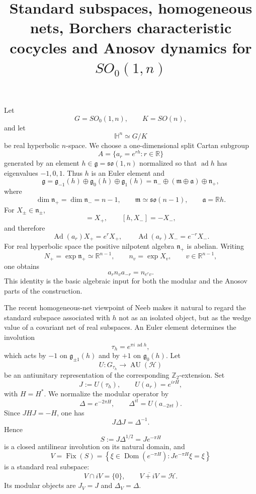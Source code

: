 \documentclass[11pt]{article}
\title{\boldmath Standard subspaces, homogeneous nets, Borchers characteristic cocycles and Anosov dynamics for \(SO_0(1,n)\)}
\author[a]{}
\affiliation[a]{}
\theoremstyle{definition}
\newcommand{\cH}{\mathcal{H}}
\newcommand{\Ad}{\operatorname{Ad}}
\newcommand{\Dom}{\operatorname{Dom}}
\begin{document}
\maketitle

Let
\[
G=SO_0(1,n),\qquad K=SO(n),
\]
and let
\[
\mathbb H^n\simeq G/K
\]
be real hyperbolic \(n\)-space.  We choose a one-dimensional split Cartan subgroup
\[
A=\{a_r=e^{rh}:r\in\mathbb R\}
\]
generated by an element \(h\in\mathfrak g=\mathfrak{so}(1,n)\) normalized so that
\(\operatorname{ad}h\) has eigenvalues \(-1,0,1\).  Thus \(h\) is an Euler element and
\[
\mathfrak g
=
\mathfrak g_{-1}(h)\oplus \mathfrak g_0(h)\oplus \mathfrak g_1(h)
=
\mathfrak n_-\oplus(\mathfrak m\oplus\mathfrak a)\oplus\mathfrak n_+,
\]
where
\[
\dim \mathfrak n_+=\dim\mathfrak n_-=n-1,\qquad
\mathfrak m\simeq\mathfrak{so}(n-1),\qquad
\mathfrak a=\mathbb Rh.
\]
For \(X_\pm\in\mathfrak n_\pm\),
\begin{equation}
[h,X_+]=X_+,\qquad [h,X_-]=-X_-,
\end{equation}
and therefore
\begin{equation}
\Ad(a_r)X_+=e^rX_+,\qquad
\Ad(a_r)X_-=e^{-r}X_-.
\label{eq:root-scaling}
\end{equation}
For real hyperbolic space the positive nilpotent algebra \(\mathfrak n_+\) is abelian.
Writing
\[
N_+=\exp\mathfrak n_+\simeq\mathbb R^{n-1},
\qquad
n_v=\exp X_v,\qquad v\in\mathbb R^{n-1},
\]
one obtains
\begin{equation}
a_r n_v a_{-r}=n_{e^rv}.
\label{eq:horospherical-dilation}
\end{equation}
This identity is the basic algebraic input for both the modular and the Anosov parts of
the construction.

The recent homogeneous-net viewpoint of Neeb makes it natural to regard the standard
subspace associated with \(h\) not as an isolated object, but as the wedge value of a
covariant net of real subspaces.  An Euler element determines the involution
\[
\tau_h=e^{\pi i\,\operatorname{ad}h},
\]
which acts by \(-1\) on \(\mathfrak g_{\pm1}(h)\) and by \(+1\) on
\(\mathfrak g_0(h)\).  Let
\[
U:G_{\tau_h}\longrightarrow \operatorname{AU}(\cH)
\]
be an antiunitary representation of the corresponding \(\mathbb Z_2\)-extension.
Set
\[
J:=U(\tau_h),
\qquad
U(a_r)=e^{irH},
\]
with \(H=H^*\).  We normalize the modular operator by
\begin{equation}
\Delta=e^{-2\pi H},
\qquad
\Delta^{it}=U(a_{-2\pi t}).
\label{eq:modular-boost}
\end{equation}
Since \(JHJ=-H\), one has
\[
J\Delta J=\Delta^{-1}.
\]
Hence
\[
S:=J\Delta^{1/2}=Je^{-\pi H}
\]
is a closed antilinear involution on its natural domain, and
\begin{equation}
V
=
\operatorname{Fix}(S)
=
\left\{
\xi\in\Dom(e^{-\pi H}):Je^{-\pi H}\xi=\xi
\right\}
\label{eq:standard-subspace}
\end{equation}
is a standard real subspace:
\[
V\cap iV=\{0\},\qquad \overline{V+iV}=\cH.
\]
Its modular objects are \(J_V=J\) and \(\Delta_V=\Delta\).
\end{document}
